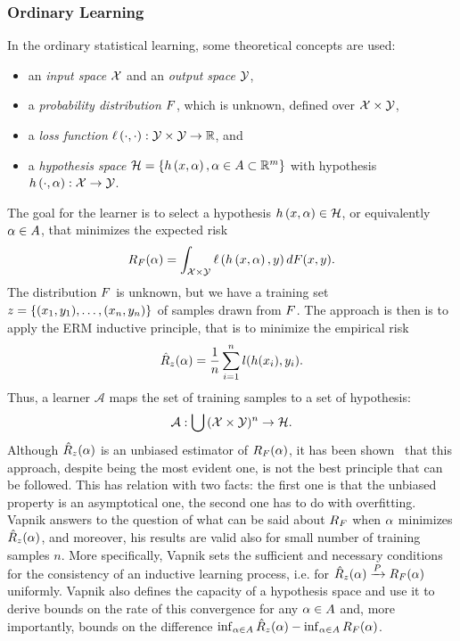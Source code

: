 \subsubsection*{Ordinary Learning}
In the ordinary statistical learning, some theoretical concepts are used:
\begin{itemize}
    \item an \emph{input space} $\mathcal{X}$ and an \emph{output space} $\mathcal{Y}$,
    \item a \emph{probability distribution} $F$, which is unknown, defined over $\mathcal{X} \times \mathcal{Y}$,
    \item a \emph{loss function} $\ell\left( \cdot, \cdot\right):\mathcal{Y} \times \mathcal{Y} \to \mathbb{R}$, and
    \item a \emph{hypothesis space} $\mathcal{H} = \left\{h\left(x, \alpha\right), \alpha \in A \subset \mathbb{R}^m\right\}$ with hypothesis $h\left(\cdot, \alpha\right): \mathcal{X} \to \mathcal{Y}$.
\end{itemize}
The goal for the learner is to select a hypothesis $h\left(x, \alpha\right) \in \mathcal{H}$, or equivalently $\alpha \in A$, that minimizes the expected risk
$$ R_F(\alpha) =  \int_{\mathcal{X} \times \mathcal{Y}} \ell\left( h\left(x, \alpha\right), y\right) dF(x, y) .$$
The distribution $F$ is unknown, but we have a training set $z = \{(x_1, y_1), \ldots, (x_n, y_n)\}$ of samples drawn from $F$. 
The approach is then is to apply the ERM inductive principle, that is to minimize the empirical risk
$$ \hat{R}_z(\alpha) = \frac{1}{n} \sum_{i=1}^n l(h(x_i), y_i).$$
Thus, a learner $\mathcal{A}$ maps the set of training samples to a set of hypothesis:
\begin{equation}
    \nonumber
    \mathcal{A} : \bigcup {(\mathcal{X}\times \mathcal{Y})^n} \to \mathcal{H}.
\end{equation}
Although $\hat{R}_z(\alpha)$ is an unbiased estimator of $R_F(\alpha)$, it has been shown~\cite{vapnik2013nature} that this approach, despite being the most evident one, is not the best principle that can be followed.
This has relation with two facts: the first one is that the unbiased property is an asymptotical one, the second one has to do with overfitting.
Vapnik answers to the question of what can be said about $R_F$ when $\alpha$ minimizes $\hat{R}_z(\alpha)$, and moreover, his results are valid also for small number of training samples $n$.
More specifically, Vapnik sets the sufficient and necessary conditions for the consistency of an inductive learning process, i.e. for $\hat{R}_z(\alpha) \xrightarrow{P} R_F(\alpha) $ uniformly. Vapnik also defines the capacity of a hypothesis space and use it to derive bounds on the rate of this convergence for any $\alpha \in A$ and, more importantly, bounds on the difference $\inf_{\alpha \in A} \hat{R}_z(\alpha) - \inf_{\alpha \in A} R_F(\alpha)$.
